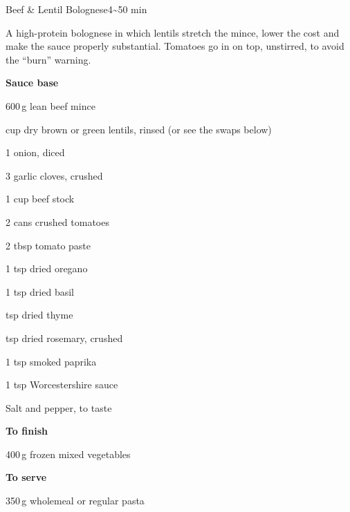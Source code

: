 

\begin{recipebox}{Beef \& Lentil Bolognese}{4}{\textasciitilde50 min}

A high-protein bolognese in which lentils stretch the mince, lower the cost and
make the sauce properly substantial. Tomatoes go in on top, unstirred, to avoid
the ``burn'' warning.

\begin{ingredients}
  \item \textbf{Sauce base}
  \item 600\,g lean beef mince
  \item {} cup dry brown or green lentils, rinsed (or see the swaps below)
  \item 1 onion, diced
  \item 3 garlic cloves, crushed
  \item 1 cup beef stock
  \item 2 cans crushed tomatoes
  \item 2 tbsp tomato paste
  \item 1 tsp dried oregano
  \item 1 tsp dried basil
  \item {} tsp dried thyme
  \item {} tsp dried rosemary, crushed
  \item 1 tsp smoked paprika
  \item 1 tsp Worcestershire sauce
  \item Salt and pepper, to taste
  \item[] \textbf{To finish}
  \item 400\,g frozen mixed vegetables
  \item[] \textbf{To serve}
  \item 350\,g wholemeal or regular pasta
\end{ingredients}


\end{recipebox}
